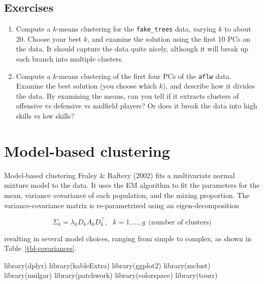 \documentclass[
  letterpaper,
]{book}
\newenvironment{Shaded}{\begin{snugshade}}{\end{snugshade}}
\newcommand{\FunctionTok}[1]{\textcolor[rgb]{0.28,0.35,0.67}{#1}}
\newcommand{\NormalTok}[1]{\textcolor[rgb]{0.00,0.23,0.31}{#1}}
\providecommand{\tightlist}{%
  \setlength{\itemsep}{0pt}\setlength{\parskip}{0pt}}\usepackage{longtable,booktabs,array}
\begin{document}
\hypertarget{exercises-7}{%
\section*{Exercises}\label{exercises-7}}


\begin{enumerate}
\def\labelenumi{\arabic{enumi}.}
\tightlist
\item
  Compute a \(k\)-means clustering for the \texttt{fake\_trees} data,
  varying \(k\) to about 20. Choose your best \(k\), and examine the
  solution using the first 10 PCs on the data. It should capture the
  data quite nicely, although it will break up each branch into multiple
  clusters.
\item
  Compute a \(k\)-means clustering of the first four PCs of the
  \texttt{aflw} data. Examine the best solution (you choose which
  \(k\)), and describe how it divides the data. By examining the means,
  can you tell if it extracts clusters of offensive vs defensive vs
  midfield players? Or does it break the data into high skills vs low
  skills?
\end{enumerate}

\hypertarget{sec-mclust}{%
\chapter{Model-based clustering}\label{sec-mclust}}


Model-based clustering Fraley \& Raftery (2002) fits a multivariate
normal mixture model to the data. It uses the EM algorithm to fit the
parameters for the mean, variance--covariance of each population, and
the mixing proportion. The variance-covariance matrix is re-parametrized
using an eigen-decomposition

\[
\Sigma_k = \lambda_kD_kA_kD_k^\top, ~~~k=1, \dots, g ~~\mbox{(number of clusters)}
\]

\noindent resulting in several model choices, ranging from simple to
complex, as shown in Table~\ref{tbl-covariances}.

\begin{Shaded}
\begin{Highlighting}[]
\FunctionTok{library}\NormalTok{(dplyr)}
\FunctionTok{library}\NormalTok{(kableExtra)}
\FunctionTok{library}\NormalTok{(ggplot2)}
\FunctionTok{library}\NormalTok{(mclust)}
\FunctionTok{library}\NormalTok{(mulgar)}
\FunctionTok{library}\NormalTok{(patchwork)}
\FunctionTok{library}\NormalTok{(colorspace)}
\FunctionTok{library}\NormalTok{(tourr)}
\end{Highlighting}
\end{Shaded}
\end{document}
